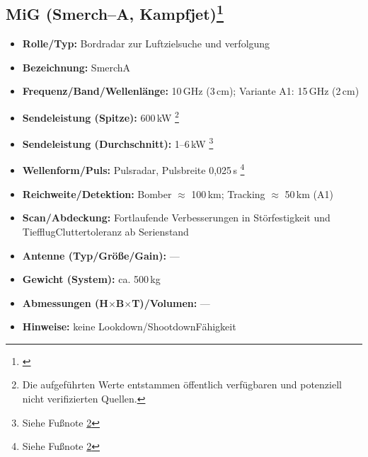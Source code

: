 \subsection*{MiG (Smerch--A, Kampfjet)\footnote{ \parencite{MiGAlley_Smerch}}}
\begin{itemize}
  \item \textbf{Rolle/Typ:} Bordradar zur Luftzielsuche und \-verfolgung
  \item \textbf{Bezeichnung:} Smerch\textendash A
  \item \textbf{Frequenz/Band/Wellenlänge:} 10\,GHz (3\,cm); Variante A1: 15\,GHz (2\,cm)
  \item \textbf{Sendeleistung (Spitze):} 600\,kW \footnote{ \label{fn:nicht_belastbar} Die aufgeführten Werte entstammen öffentlich verfügbaren und potenziell nicht verifizierten Quellen.}
  \item \textbf{Sendeleistung (Durchschnitt):}  1–6\,kW \footnote{Siehe Fußnote \ref{fn:nicht_belastbar}}
  \item \textbf{Wellenform/Puls:}  Pulsradar, Pulsbreite 0{,}025\,\textmu s \footnote{Siehe Fußnote \ref{fn:nicht_belastbar}}
  \item \textbf{Reichweite/Detektion:} Bomber \(\approx\) 100\,km; Tracking \(\approx\) 50\,km (A1)
  \item \textbf{Scan/Abdeckung:} Fortlaufende Verbesserungen in Störfestigkeit und Tiefflug\-Clutter\-toleranz ab Serienstand
  \item \textbf{Antenne (Typ/Größe/Gain):} ---
  \item \textbf{Gewicht (System):} ca. 500\,kg
  \item \textbf{Abmessungen (H\(\times\)B\(\times\)T)/Volumen:} ---
  \item \textbf{Hinweise:}  keine Look\-down/Shoot\-down\-Fähigkeit 
\end{itemize}

